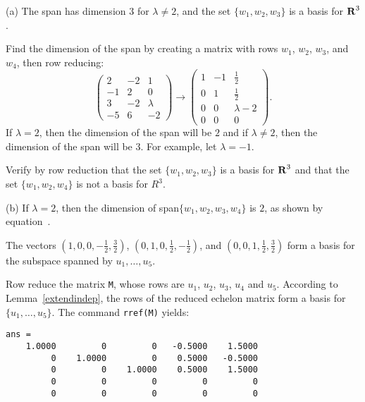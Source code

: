 \documentclass{ximera}
\begin{document}
(a) \ans The span has dimension $3$ for $\lambda \neq 2$, and 
the set $\{w_1,w_2,w_3\}$ is a basis for $\mbox{$\bf{R}$}^3$.

\soln Find the dimension of the span by creating a matrix with rows
$w_1$, $w_2$, $w_3$, and $w_4$, then row reducing:
\begin{equation} \label{exeq:5.6.4}
\left(\begin{array}{rrr} 2 & -2 & 1 \\ -1 & 2 & 0 \\ 3 & -2 &
\lambda \\ -5 & 6 & -2 \end{array}\right) \longrightarrow
\left(\begin{array}{rrc} 1 & -1 & \frac{1}{2} \\ 0 & 1 & \frac{1}{2}
\\ 0 & 0 & \lambda - 2 \\ 0 & 0 & 0 \end{array}\right).
\end{equation}
If $\lambda = 2$, then the dimension of the span will
be $2$ and if $\lambda \neq 2$, then the dimension of the span
will be $3$.  For example, let $\lambda = -1$.

\para Verify by row reduction that the set $\{w_1,w_2,w_3\}$ is a basis
for $\mbox{$\bf{R}$}^3$ and that the set $\{w_1,w_2,w_4\}$ is not a basis for $R^3$. 

(b) If $\lambda = 2$, then the dimension of span$\{w_1,w_2,w_3,w_4\}$
is $2$, as shown by equation~.

\ans The vectors $(1,0,0,-\frac{1}{2},\frac{3}{2})$, $(0,1,0,\frac{1}{2},
-\frac{1}{2})$, and $(0,0,1,\frac{1}{2},\frac{3}{2})$ form a basis
for the subspace spanned by $u_1, \dots ,u_5$.

\soln Row reduce the matrix {\tt M}, whose
rows are $u_1$, $u_2$, $u_3$, $u_4$ and $u_5$.  According to 
Lemma~\ref{extendindep}, the rows of the
reduced echelon matrix form a basis for $\{u_1,\dots ,u_5\}$.  The
command {\tt rref(M)} yields:
\begin{verbatim}
ans =
    1.0000         0         0   -0.5000    1.5000
         0    1.0000         0    0.5000   -0.5000
         0         0    1.0000    0.5000    1.5000
         0         0         0         0         0
         0         0         0         0         0
\end{verbatim}
\end{document}
